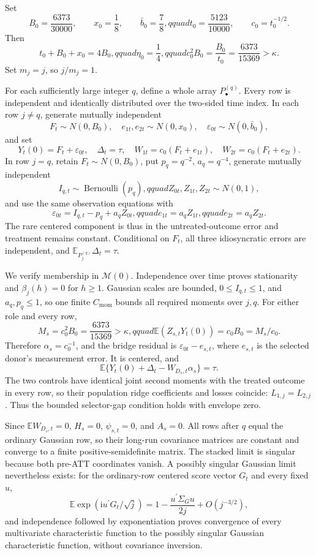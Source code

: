 Set
\[
 B_0=\frac{6373}{30000},\qquad x_0=\frac18,
 \qquad \bar b_0=\frac78,qquad t_0=\frac{5123}{10000},
 \qquad c_0=t_0^{-1/2}.
\]
Then
\[
 t_0+B_0+x_0=4B_0,qquad \eta_0=\frac14,qquad
 c_0^2B_0=\frac{B_0}{t_0}=\frac{6373}{15369}>\kappa.
\]
Set \(m_j=j\), so \(j/m_j=1\).

For each sufficiently large integer \(q\), define a whole array \(P_\bullet^{(q)}\).  Every row is independent and identically distributed over the two-sided time index.  In each row \(j\ne q\), generate mutually independent
\[
 F_t\sim N(0,B_0),\quad e_{1t},e_{2t}\sim N(0,x_0),
 \quad \varepsilon_{0t}\sim N(0,\bar b_0),
\]
and set
\[
 Y_t(0)=F_t+\varepsilon_{0t},\quad \Delta_t=\tau,
 \quad W_{1t}=c_0(F_t+e_{1t}),\quad W_{2t}=c_0(F_t+e_{2t}).
\]
In row \(j=q\), retain \(F_t\sim N(0,B_0)\), put \(p_q=q^{-2}\), \(a_q=q^{-4}\), generate mutually independent
\[
 I_{q,t}\sim\operatorname{Bernoulli}(p_q),qquad
 Z_{0t},Z_{1t},Z_{2t}\sim N(0,1),
\]
and use the same observation equations with
\[
 \varepsilon_{0t}=I_{q,t}-p_q+a_qZ_{0t},qquad
 e_{1t}=a_qZ_{1t},qquad e_{2t}=a_qZ_{2t}.
\]
The rare centered component is thus in the untreated-outcome error and treatment remains constant.  Conditional on \(F_t\), all three idiosyncratic errors are independent, and \(\mathbb E_{P_j^{(q)}}\Delta_t=\tau\).

We verify membership in \(\mathcal M(0)\).  Independence over time proves stationarity and \(\beta_j(h)=0\) for \(h\geq1\).  Gaussian scales are bounded, \(0\leq I_{q,t}\leq1\), and \(a_q,p_q\leq1\), so one finite \(C_{\mathrm{mom}}\) bounds all required moments over \(j,q\).  For either role and every row,
\[
 M_s=c_0^2B_0=\frac{6373}{15369}>\kappa,qquad
 \mathbb E(Z_{s,t}Y_t(0))=c_0B_0=M_s/c_0.
\]
Therefore \(\alpha_s=c_0^{-1}\), and the bridge residual is \(\varepsilon_{0t}-e_{s,t}\), where \(e_{s,t}\) is the selected donor's measurement error.  It is centered, and
\[
 \mathbb E\{Y_t(0)+\Delta_t-W_{D_s,t}\alpha_s\}=\tau.
\]
The two controls have identical joint second moments with the treated outcome in every row, so their population ridge coefficients and losses coincide: \(L_{1,j}=L_{2,j}\).  Thus the bounded selector-gap condition holds with envelope zero.

Since \(\mathbb EW_{D_s,t}=0\), \(H_s=0\), \(\psi_{s,t}=0\), and \(A_s=0\).  All rows after \(q\) equal the ordinary Gaussian row, so their long-run covariance matrices are constant and converge to a finite positive-semidefinite matrix.  The stacked limit is singular because both pre-ATT coordinates vanish.  A possibly singular Gaussian limit nevertheless exists: for the ordinary-row centered score vector \(G_t\) and every fixed \(u\),
\[
 \mathbb E\exp(\mathrm iu^{\prime}G_t/\sqrt j)
 =1-\frac{u^{\prime}\Sigma_Gu}{2j}+O(j^{-3/2}),
\]
and independence followed by exponentiation proves convergence of every multivariate characteristic function to the possibly singular Gaussian characteristic function, without covariance inversion.

